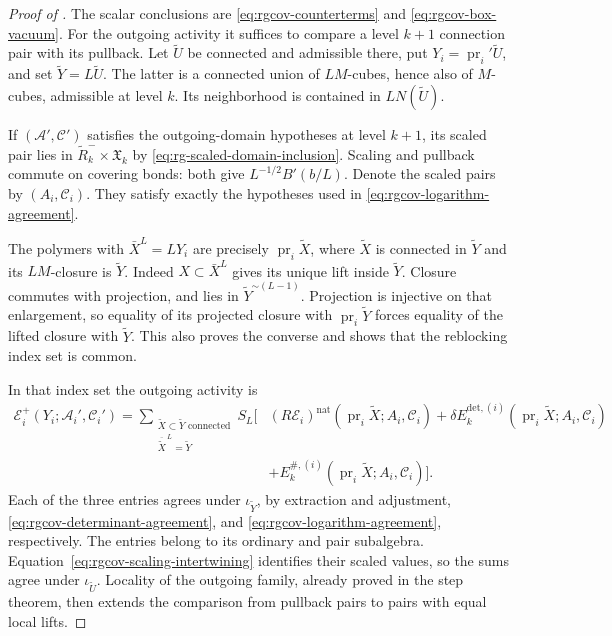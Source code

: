 \begin{proof}[Proof of ]
The scalar conclusions are
\eqref{eq:rgcov-counterterms} and
\eqref{eq:rgcov-box-vacuum}.
For the outgoing activity it suffices to compare a
level $k+1$ connection pair with its pullback.
Let $\widetilde U$ be connected and admissible there,
put $Y_i=\operatorname{pr}_i'\widetilde U$,
and set $\widetilde Y=L\widetilde U$.
The latter is a connected union of $LM$-cubes,
hence also of $M$-cubes, admissible at level $k$.
Its neighborhood is contained in $L N(\widetilde U)$.

If $(\mathscr A',\mathscr C')$ satisfies the outgoing-domain hypotheses at level
$k+1$, its scaled pair lies in
$\widetilde R_k^-\times\mathfrak X_k$ by
\eqref{eq:rg-scaled-domain-inclusion}.
Scaling and pullback commute on covering bonds:
both give $L^{-1/2}B'(b/L)$.
Denote the scaled pairs by $(A_i,\mathscr C_i)$.
They satisfy exactly the hypotheses used in
\eqref{eq:rgcov-logarithm-agreement}.

The polymers with $\bar X^L=LY_i$ are precisely
$\operatorname{pr}_i\widetilde X$, where
$\widetilde X$ is connected in $\widetilde Y$ and
its $LM$-closure is $\widetilde Y$.
Indeed $X\subset\bar X^L$ gives its unique lift
inside $\widetilde Y$. Closure commutes with projection,
and lies in $\widetilde Y^{\sim(L-1)}$.
Projection is injective on that enlargement,
so equality of its projected closure with
$\operatorname{pr}_i\widetilde Y$ forces equality
of the lifted closure with $\widetilde Y$.
This also proves the converse and shows that the
reblocking index set is common.

In that index set the outgoing activity is
\begin{align}
 \mathscr E_i^+(Y_i;\mathscr A_i',\mathscr C_i')
  =\sum_{\substack{\widetilde X\subset\widetilde Y\text{ connected}\\
                         \overline{\widetilde X}^{\,L}=\widetilde Y}}
 S_L\Big[&
     (R\mathscr E_i)^{\mathrm{nat}}
                  (\operatorname{pr}_i\widetilde X;A_i,\mathscr C_i)
       +\delta E_k^{\mathrm{det},(i)}
                  (\operatorname{pr}_i\widetilde X;A_i,\mathscr C_i)
       \nonumber\\
       &+E_k^{\#,(i)}
                  (\operatorname{pr}_i\widetilde X;A_i,\mathscr C_i)\Big].
                                      \label{eq:rgcov-reblocked-comparison}
\end{align}
Each of the three entries agrees under
$\iota_{\widetilde Y}$, by extraction and adjustment,
\eqref{eq:rgcov-determinant-agreement}, and
\eqref{eq:rgcov-logarithm-agreement}, respectively.
The entries belong to its ordinary and pair subalgebra.
Equation~\eqref{eq:rgcov-scaling-intertwining} identifies
their scaled values, so the sums agree under
$\iota_{\widetilde U}$.
Locality of the outgoing family, already proved in
the step theorem, then extends the comparison
from pullback pairs to pairs with equal local lifts.


\end{proof}
